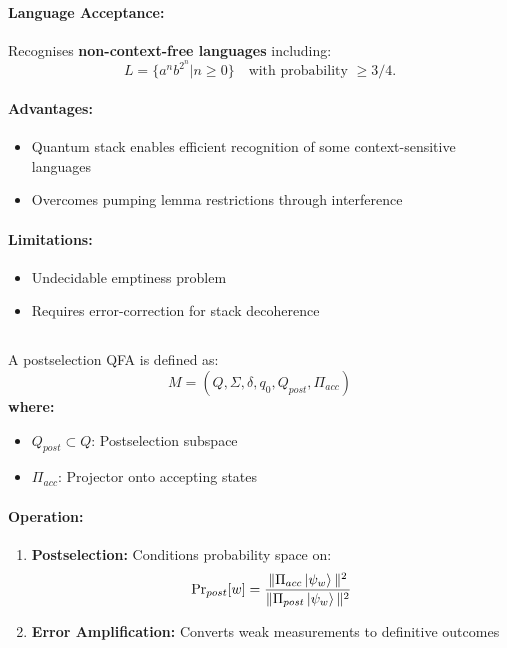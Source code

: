 \paragraph{Language Acceptance:}
Recognises \textbf{non-context-free languages} including:
\[
L = \{a^nb^{2^n} | n \geq 0\} \quad \text{with probability } \geq 3/4. 
\]
\cite{bertoni2001quantum}

\paragraph{Advantages:}
\begin{itemize}
    \item Quantum stack enables efficient recognition of some context-sensitive languages \cite{ambainis2002quantum}
    \item Overcomes pumping lemma restrictions through interference
\end{itemize}

\paragraph{Limitations:}
\begin{itemize}
    \item Undecidable emptiness problem
    \item Requires error-correction for stack decoherence
\end{itemize}

\subsection{}
\label{subsec:psqfa}

\begin{definition}
A postselection QFA \cite{aaronson2005complexity} is defined as:
\[
M = (Q, \Sigma, \delta, q_0, Q_{post}, \Pi_{acc})
\]
\textbf{where:}
\begin{itemize}
    \item $Q_{post} \subset Q$: Postselection subspace
    \item $\Pi_{acc}$: Projector onto accepting states
\end{itemize}
\end{definition}

\paragraph{Operation:}
\begin{enumerate}
    \item \textbf{Postselection:} Conditions probability space on:
    \[
    \text{Pr}_{post}[w] = \frac{\|\Pi_{acc}\ket{\psi_w}\|^2}{\|\Pi_{post}\ket{\psi_w}\|^2}
    \]
    \item \textbf{Error Amplification:} Converts weak measurements to definitive outcomes \cite{yamakami2014constant}
\end{enumerate}

